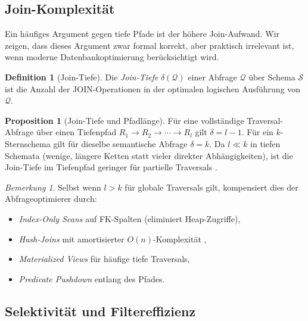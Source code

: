 ﻿\documentclass[12pt,a4paper]{article}
\theoremstyle{definition}
\newtheorem{definition}{Definition}[section]
\newtheorem{proposition}[theorem]{Proposition}
\theoremstyle{remark}
\newtheorem{remark}{Bemerkung}[section]
\begin{document}
\subsection{Join-Komplexität}

Ein häufiges Argument gegen tiefe Pfade ist der höhere Join-Aufwand.
Wir zeigen, dass dieses Argument zwar formal korrekt, aber praktisch
irrelevant ist, wenn moderne Datenbankoptimierung berücksichtigt wird.

\begin{definition}[Join-Tiefe]
Die \emph{Join-Tiefe} $\delta(\mathcal{Q})$ einer Abfrage $\mathcal{Q}$ über
Schema $\mathcal{S}$ ist die Anzahl der JOIN-Operationen in der optimalen
logischen Ausführung von $\mathcal{Q}$.
\end{definition}

\begin{proposition}[Join-Tiefe und Pfadlänge]
\label{prop:jointiefe}
Für eine vollständige Traversal-Abfrage über einen Tiefenpfad
$R_1 \to R_2 \to \cdots \to R_l$ gilt $\delta = l - 1$.
Für ein $k$-Sternschema gilt für dieselbe semantische Abfrage $\delta = k$.
Da $l \ll k$ in tiefen Schemata (wenige, längere Ketten statt vieler
direkter Abhängigkeiten), ist die Join-Tiefe im Tiefenpfad geringer
für partielle Traversals \cite{Ramakrishnan2003}.
\end{proposition}

\begin{remark}
Selbst wenn $l > k$ für globale Traversals gilt, kompensiert dies der
Abfrageoptimierer durch:
\begin{itemize}
  \item \emph{Index-Only Scans} auf FK-Spalten (eliminiert Heap-Zugriffe),
  \item \emph{Hash-Joins} mit amortisierter $O(n)$-Komplexität \cite{Graefe1993},
  \item \emph{Materialized Views} für häufige tiefe Traversals,
  \item \emph{Predicate Pushdown} entlang des Pfades.
\end{itemize}
\end{remark}

\subsection{Selektivität und Filtereffizienz}
\end{document}
